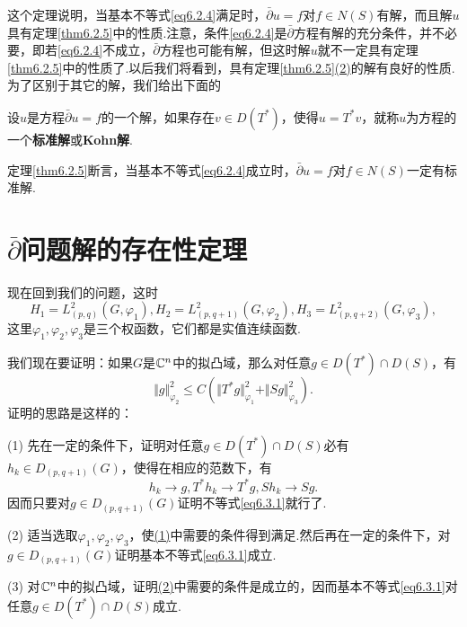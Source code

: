 这个定理说明，当基本不等式\eqref{eq6.2.4}满足时，$\bar{\partial}u=f$对$f\in N(S)$有解，而且解$u$具有定理\ref{thm6.2.5}中的性质.注意，条件\eqref{eq6.2.4}是$\bar{\partial}$方程有解的充分条件，并不必要，即若\eqref{eq6.2.4}不成立，$\bar{\partial}$方程也可能有解，但这时解$u$就不一定具有定理\ref{thm6.2.5}中的性质了.以后我们将看到，具有定理\ref{thm6.2.5}\hyperlink{6.2.5}{(2)}的解有良好的性质.为了区别于其它的解，我们给出下面的
\begin{definition}\label{def6.2.6}
	设$u$是方程$\bar{\partial}u=f$的一个解，如果存在$v\in D(T^\ast)$，使得$u=T^\ast v$，就称$u$为方程的一个\textbf{标准解}或\textbf{Kohn解}.
\end{definition}
定理\ref{thm6.2.5}断言，当基本不等式\eqref{eq6.2.4}成立时，$\bar{\partial}u=f$对$f\in N(S)$一定有标准解.
\section{$\bar{\partial}$问题解的存在性定理\label{sec6.3}}
现在回到我们的问题，这时
\[H_1=L_{(p,q)}^2(G,\varphi_1),H_2=L_{(p,q+1)}^2(G,\varphi_2),H_3=L_{(p,q+2)}^2(G,\varphi_3),\]
这里$\varphi_1,\varphi_2,\varphi_3$是三个权函数，它们都是实值连续函数.

我们现在要证明：如果$G$是$\mathbb C^n$中的拟凸域，那么对任意$g\in D(T^\ast)\cap D(S)$，有
\begin{equation}\label{eq6.3.1}
	\Vert g\Vert_{\varphi_2}^2\le C\left(\Vert T^\ast g\Vert_{\varphi_1}^2+\Vert Sg\Vert_{\varphi_3}^2\right).
\end{equation}
证明的思路是这样的：

(1)\hypertarget{6.3}{}
先在一定的条件下，证明对任意$g\in D(T^\ast)\cap D(S)$必有$h_k\in D_{(p,q+1)}(G)$，使得在相应的范数下，有
\[h_k\to g,T^\ast h_k\to T^\ast g,Sh_k\to Sg.\]
因而只要对$g\in D_{(p,q+1)}(G)$证明不等式\eqref{eq6.3.1}就行了.

(2)\hypertarget{6.3}{}
适当选取$\varphi_1,\varphi_2,\varphi_3$，使\hyperlink{6.3}{(1)}中需要的条件得到满足.然后再在一定的条件下，对$g\in D_{(p,q+1)}(G)$证明基本不等式\eqref{eq6.3.1}成立.

(3)
对$\mathbb C^n$中的拟凸域，证明\hyperlink{6.3}{(2)}中需要的条件是成立的，因而基本不等式\eqref{eq6.3.1}对任意$g\in D(T^\ast)\cap D(S)$成立.
